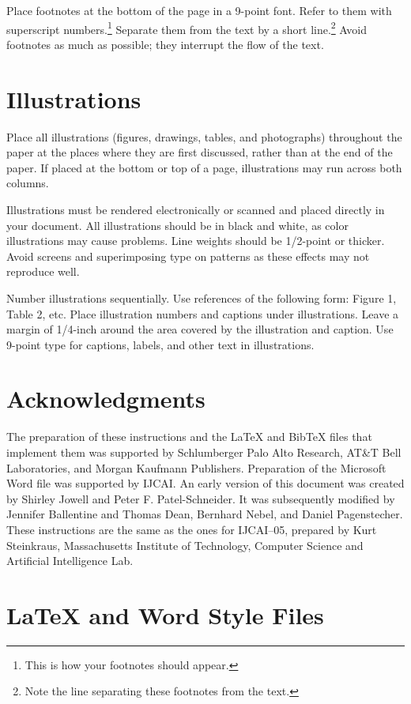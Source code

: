 \documentclass{article}
\begin{document}
Place footnotes at the bottom of the page in a 9-point font.  Refer to
them with superscript numbers.\footnote{This is how your footnotes
should appear.} Separate them from the text by a short
line.\footnote{Note the line separating these footnotes from the
text.} Avoid footnotes as much as possible; they interrupt the flow of
the text.

\section{Illustrations}

Place all illustrations (figures, drawings, tables, and photographs)
throughout the paper at the places where they are first discussed,
rather than at the end of the paper. If placed at the bottom or top of
a page, illustrations may run across both columns.

Illustrations must be rendered electronically or scanned and placed
directly in your document. All illustrations should be in black and
white, as color illustrations may cause problems. Line weights should
be 1/2-point or thicker. Avoid screens and superimposing type on
patterns as these effects may not reproduce well.

Number illustrations sequentially. Use references of the following
form: Figure 1, Table 2, etc. Place illustration numbers and captions
under illustrations. Leave a margin of 1/4-inch around the area
covered by the illustration and caption.  Use 9-point type for
captions, labels, and other text in illustrations.

\section*{Acknowledgments}

The preparation of these instructions and the \LaTeX{} and Bib\TeX{}
files that implement them was supported by Schlumberger Palo Alto
Research, AT\&T Bell Laboratories, and Morgan Kaufmann Publishers.
Preparation of the Microsoft Word file was supported by IJCAI.  An
early version of this document was created by Shirley Jowell and Peter
F. Patel-Schneider.  It was subsequently modified by Jennifer
Ballentine and Thomas Dean, Bernhard Nebel, and Daniel Pagenstecher.
These instructions are the same as the ones for IJCAI--05, prepared by
Kurt Steinkraus, Massachusetts Institute of Technology, Computer
Science and Artificial Intelligence Lab.

\appendix

\section{\LaTeX{} and Word Style Files}\label{stylefiles}
\end{document}
